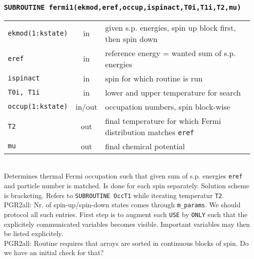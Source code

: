 \documentclass[final,1p]{elsarticle}
\newcommand{\PGRcomm}[1]{{\color{blue}\small PGR2all: #1}}
\begin{document}
\subsubsection*{\tt SUBROUTINE fermi1(ekmod,eref,occup,ispinact,T0i,T1i,T2,mu)}
\begin{tabular}{lcl}
 {\tt ekmod(1:kstate)} & in & given s.p. energies, spin up block first, then
 spin down\\
 {\tt eref}& in & reference energy = wanted sum of s.p. energies\\
 {\tt ispinact}& in & spin for which routine is run\\
 {\tt T0i, T1i}& in & lower and upper temperature for search\\
 {\tt occup(1:kstate)}& in/out & occupation numbers, spin block-wise\\
 {\tt T2} & out & final temperature for which Fermi distribution
 matches {\tt eref} \\
 {\tt mu} & out & final chemical potential\\
\end{tabular}
\\[4pt]
Determines thermal Fermi occupation such that given sum of
s.p. energies {\tt eref} and particle number is matched. Is done for
each spin separately. Solution scheme is bracketing. Refers to 
{\tt SUBROUTINE OccT1} while iterating temperatur {\tt T2}.
\\
\PGRcomm{Nr. of spin-up/spin-down states comes through {\tt m\_params}. 
We should protocol all such entries. First step is to augment each
{\tt USE} by {\tt ONLY} such that the explicitely communicated
variables becomes visible. Important variables may then be listed
explicitely.
}
\\
\PGRcomm{Routine requires that arrays are sorted in continuous blocks of
  spin. Do we have an initial check for that?}
\end{document}
